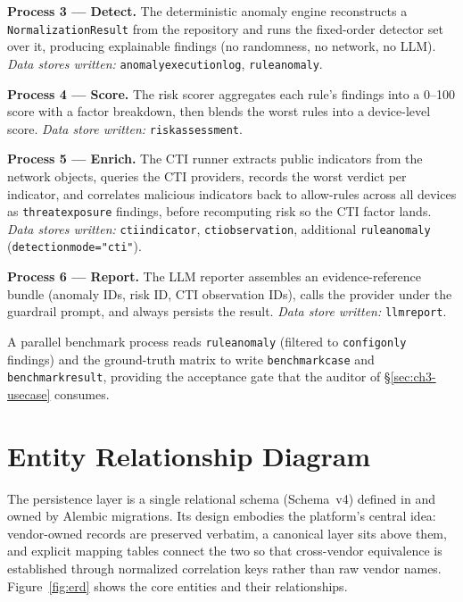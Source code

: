 \documentclass[12pt,a4paper]{report}
\renewcommand{\_}{\textunderscore\allowbreak}
\begin{document}
\textbf{Process 3 --- Detect.} The deterministic anomaly engine reconstructs a \texttt{NormalizationResult} from the repository and runs the fixed-order detector set over it, producing explainable findings (no randomness, no network, no LLM). \textit{Data stores written:} \texttt{anomaly\_execution\_log}, \texttt{rule\_anomaly}.

\textbf{Process 4 --- Score.} The risk scorer aggregates each rule's findings into a 0--100 score with a factor breakdown, then blends the worst rules into a device-level score. \textit{Data store written:} \texttt{risk\_assessment}.

\textbf{Process 5 --- Enrich.} The CTI runner extracts public indicators from the network objects, queries the CTI providers, records the worst verdict per indicator, and correlates malicious indicators back to allow-rules across all devices as \texttt{threat\_exposure} findings, before recomputing risk so the CTI factor lands. \textit{Data stores written:} \texttt{cti\_indicator}, \texttt{cti\_observation}, additional \texttt{rule\_anomaly} (\texttt{detection\_mode="cti"}).

\textbf{Process 6 --- Report.} The LLM reporter assembles an evidence-reference bundle (anomaly IDs, risk ID, CTI observation IDs), calls the provider under the guardrail prompt, and always persists the result. \textit{Data store written:} \texttt{llm\_report}.

A parallel benchmark process reads \texttt{rule\_anomaly} (filtered to \texttt{config\_only} findings) and the ground-truth matrix to write \texttt{benchmark\_case} and \texttt{benchmark\_result}, providing the acceptance gate that the auditor of \S\ref{sec:ch3-usecase} consumes.

\section{Entity Relationship Diagram}
\label{sec:ch3-erd}

The persistence layer is a single relational schema (Schema~v4) defined in  and owned by Alembic migrations. Its design embodies the platform's central idea: vendor-owned records are preserved verbatim, a canonical layer sits above them, and explicit mapping tables connect the two so that cross-vendor equivalence is established through normalized correlation keys rather than raw vendor names. Figure~\ref{fig:erd} shows the core entities and their relationships.
\end{document}
